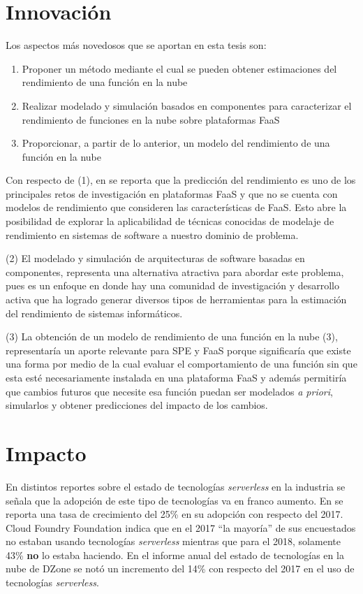 \section{Innovación}
Los aspectos más novedosos que se aportan en esta tesis son:
\begin{enumerate}
    \item Proponer un método mediante el cual se pueden obtener estimaciones del rendimiento de una función en la nube
    \item Realizar modelado y simulación basados en componentes para caracterizar el rendimiento de funciones en la nube sobre plataformas FaaS
    \item Proporcionar, a partir de lo anterior, un modelo del rendimiento de una función en la nube    
\end{enumerate}

Con respecto de (1), en \cite{vanEyk:2018:SRC:3185768.3186308} se reporta que la predicción del rendimiento es uno de los principales retos de investigación en plataformas FaaS y que no se cuenta con modelos de rendimiento que consideren las características de FaaS. Esto abre la posibilidad de explorar la aplicabilidad de técnicas conocidas de modelaje de rendimiento en sistemas de software a nuestro dominio de problema. 

(2) El modelado y simulación de arquitecturas de software basadas en componentes, representa una alternativa atractiva para abordar este problema, pues es un enfoque en donde hay una comunidad de investigación y desarrollo activa que ha logrado generar diversos tipos de herramientas para la estimación del rendimiento de sistemas informáticos. 

(3) La obtención de un modelo de rendimiento de una función en la nube (3), representaría un aporte relevante para SPE y FaaS porque significaría que existe una forma por medio de la cual evaluar el comportamiento de una función sin que esta esté necesariamente instalada en una plataforma FaaS y además permitiría que cambios futuros que necesite esa función puedan ser modelados \emph{a priori}, simularlos y obtener predicciones del impacto de los cambios.



\section{Impacto}
En distintos reportes sobre el estado de tecnologías \emph{serverless} en la industria \cite{dzone-cloud-2018,rightscale-2018,digital-ocean-2018,pivotal-june-2018} se señala que la adopción de este tipo de tecnologías va en franco aumento. En \cite{rightscale-2018} se reporta una tasa de crecimiento del 25\% en su adopción con respecto del 2017. Cloud Foundry Foundation \cite{pivotal-june-2018} indica que en el 2017 ``la mayoría'' de sus encuestados no estaban usando tecnologías \emph{serverless} mientras que para el 2018, solamente 43\% \textbf{no} lo estaba haciendo. En el informe anual del estado de tecnologías en la nube de DZone\cite{dzone-cloud-2018} se notó un incremento del 14\% con respecto del 2017 en el uso de tecnologías \emph{serverless}.

